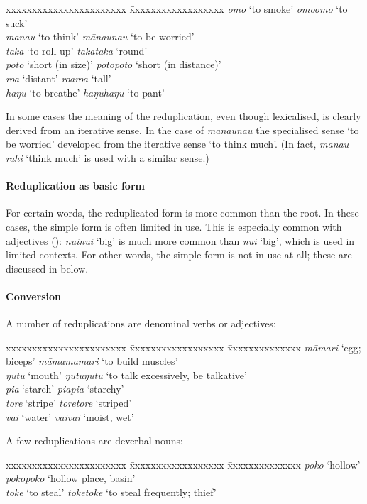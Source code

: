 \ea
\begin{tabbing}
xxxxxxxxxxxxxxxxxxxxxxx \= xxxxxxxxxxxxxxxxxx\kill
  \textit{{\ꞌ}omo} ‘to smoke’ \> \textit{{\ꞌ}omo{\ꞌ}omo} ‘to suck’\\
  \textit{mana{\ꞌ}u} ‘to think’ \> \textit{māna{\ꞌ}una{\ꞌ}u} ‘to be worried’\\
  \textit{taka} ‘to roll up’ \> \textit{takataka} ‘round’\\
  \textit{poto} ‘short (in size)’ \>  \textit{potopoto} ‘short (in distance)’\\
  \textit{roa} ‘distant’ \> \textit{roaroa} ‘tall’\\
  \textit{haŋu} ‘to breathe’ \> \textit{haŋuhaŋu} ‘to pant’
\end{tabbing}
\z 
In some cases the meaning of the reduplication, even though lexicalised, is clearly derived from an iterative sense. In the case of \textit{māna{\ꞌ}una{\ꞌ}u} the specialised sense ‘to be worried’ developed from the iterative sense ‘to think much’. (In fact, \textit{mana{\ꞌ}u rahi} ‘think much’ is used with a similar sense.)

\paragraph{Reduplication as basic form}\label{sec:2.6.2.2.5} For certain words, the reduplicated form is more common than the root. In these cases, the simple form is often limited in use. This is especially common with adjectives (): \textit{nuinui} ‘big’ is much more common than \textit{nui} ‘big’, which is used in limited contexts. For other words, the simple form is not in use at all; these are discussed in  below. 

\paragraph{Conversion}\label{sec:2.6.2.2.6} A number of reduplications are denominal verbs or adjectives:

\ea 
\begin{tabbing}
 xxxxxxxxxxxxxxxxxxxxxxx \= xxxxxxxxxxxxxxxxxx \= xxxxxxxxxxxxxx \kill
  \textit{māmari} ‘egg; biceps’ \> \textit{māmamamari} ‘to build muscles’\\
  \textit{ŋutu} ‘mouth’ \> \textit{ŋutuŋutu} ‘to talk excessively, be talkative’\\
  \textit{pia} ‘starch’  \>\textit{piapia} ‘starchy’\\
  \textit{tore} ‘stripe’ \> \textit{toretore} ‘striped’\\
  \textit{vai} ‘water’ \> \textit{vaivai} ‘moist, wet’
\end{tabbing}
\z 
A few reduplications are deverbal nouns:
\ea
\begin{tabbing}
 xxxxxxxxxxxxxxxxxxxxxxx \= xxxxxxxxxxxxxxxxxx \= xxxxxxxxxxxxxx \kill
  \textit{poko} ‘hollow’  \>\textit{pokopoko} ‘hollow place, basin’\\
  \textit{toke} ‘to steal’ \> \textit{toketoke} ‘to steal frequently; thief’
\end{tabbing}
\z 
